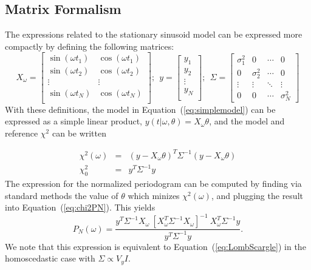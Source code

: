 \documentclass[12pt,preprint]{aastex}
\newcommand{\Eq}[1]{Equation~(\ref{eq:#1})}
\newcommand{\eq}[1]{\Eq{#1}}
\newcommand{\eqlabel}[1]{\label{eq:#1}}
\begin{document}
\subsection{Matrix Formalism}
The expressions related to the stationary sinusoid model can be expressed more compactly by defining the following matrices:
\begin{equation}
X_\omega = \left[
\begin{array}{cc}
\sin(\omega t_1) & \cos(\omega t_1)\\
\sin(\omega t_2) & \cos(\omega t_2)\\
\vdots & \vdots \\
\sin(\omega t_N) & \cos(\omega t_N)\\
\end{array}
\right];~~
y = \left[
\begin{array}{c}
y_1 \\
y_2\\
\vdots \\
y_N\\
\end{array}
\right];~~
\Sigma = \left[
\begin{array}{cccc}
\sigma_1^2 & 0 &  \cdots & 0\\
0 & \sigma_2^2 &  \cdots & 0\\
\vdots & \vdots &  \ddots & \vdots\\
0 & 0 &  \cdots & \sigma_N^2
\end{array}
\right]
\end{equation}
With these definitions, the model in \eq{simplemodel} can be expressed as a simple linear product, $y(t|\omega,\theta) = X_\omega\theta$, and the model and reference $\chi^2$ can be written

\begin{eqnarray}
  \chi^2(\omega) &=& (y - X_\omega\theta)^T\Sigma^{-1}(y - X_\omega\theta)\\
  \chi^2_0 &=& y^T \Sigma^{-1} y
\end{eqnarray}
The expression for the normalized periodogram can be computed by finding via standard methods the value of $\theta$ which minizes $\chi^2(\omega)$, and plugging the result into \eq{chi2PN}. This yields
\begin{equation}
  \eqlabel{LombScargle2}
  P_N(\omega) = \frac{y^T\Sigma^{-1}X_\omega~[X_\omega^T\Sigma^{-1}X_\omega]^{-1}~X_\omega^T\Sigma^{-1}y}{y^T\Sigma^{-1}y}.
\end{equation}
We note that this expression is equivalent to \eq{LombScargle} in the homoscedastic case with $\Sigma \propto V_y I$.
\end{document}
